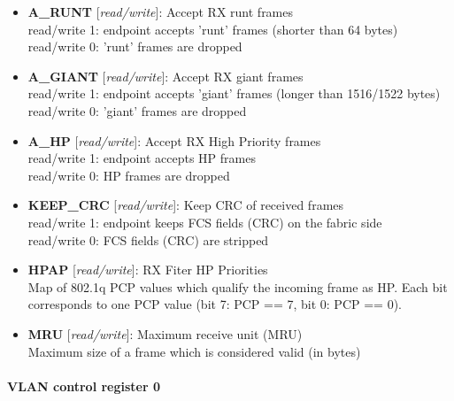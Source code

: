 \begin{itemize}
\item \begin{small}
{\bf 
A\_RUNT
} [\emph{read/write}]: Accept RX runt frames
\\
read/write 1: endpoint accepts 'runt' frames (shorter than 64 bytes)\\					               read/write 0: 'runt' frames are dropped
\end{small}
\item \begin{small}
{\bf 
A\_GIANT
} [\emph{read/write}]: Accept RX giant frames
\\
read/write 1: endpoint accepts 'giant' frames (longer than 1516/1522 bytes)\\					               read/write 0: 'giant' frames are dropped
\end{small}
\item \begin{small}
{\bf 
A\_HP
} [\emph{read/write}]: Accept RX High Priority frames
\\
read/write 1: endpoint accepts HP frames\\					               read/write 0: HP frames are dropped
\end{small}
\item \begin{small}
{\bf 
KEEP\_CRC
} [\emph{read/write}]: Keep CRC of received frames
\\
read/write 1: endpoint keeps FCS fields (CRC) on the fabric side\\					               read/write 0: FCS fields (CRC) are stripped
\end{small}
\item \begin{small}
{\bf 
HPAP
} [\emph{read/write}]: RX Fiter HP Priorities
\\
Map of 802.1q PCP values which qualify the incoming frame as HP. Each bit corresponds to one PCP value (bit 7: PCP == 7, bit 0: PCP == 0).
\end{small}
\item \begin{small}
{\bf 
MRU
} [\emph{read/write}]: Maximum receive unit (MRU)
\\
Maximum size of a frame which is considered valid (in bytes)
\end{small}
\end{itemize}
\paragraph*{VLAN control register 0}\vspace{12pt}

